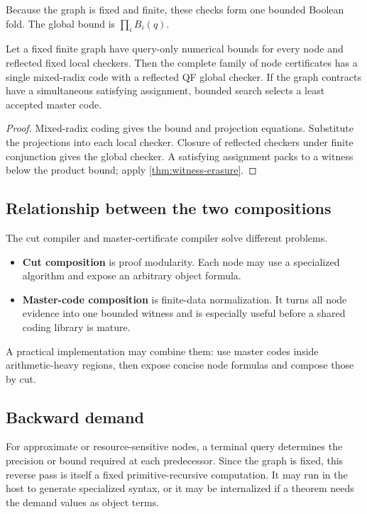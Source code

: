 Because the graph is fixed and finite, these checks form one bounded Boolean
fold.  The global bound is \(\prod_iB_i(q)\).

\begin{theorem}\label{thm:master-cert}
Let a fixed finite graph have query-only numerical bounds for every node and
reflected fixed local checkers.  Then the complete family of node certificates
has a single mixed-radix code with a reflected QF global checker.  If the graph
contracts have a simultaneous satisfying assignment, bounded search selects a
least accepted master code.
\end{theorem}

\begin{proof}
Mixed-radix coding gives the bound and projection equations.  Substitute the
projections into each local checker.  Closure of reflected checkers under
finite conjunction gives the global checker.  A satisfying assignment packs
to a witness below the product bound; apply \cref{thm:witness-erasure}.
\end{proof}

\subsection{Relationship between the two compositions}

The cut compiler and master-certificate compiler solve different problems.

\begin{itemize}
\item \textbf{Cut composition} is proof modularity.  Each node may use a
specialized algorithm and expose an arbitrary object formula.
\item \textbf{Master-code composition} is finite-data normalization.  It turns
all node evidence into one bounded witness and is especially useful before a
shared coding library is mature.
\end{itemize}

A practical implementation may combine them: use master codes inside
arithmetic-heavy regions, then expose concise node formulas and compose those
by cut.

\subsection{Backward demand}

For approximate or resource-sensitive nodes, a terminal query determines the
precision or bound required at each predecessor.  Since the graph is fixed,
this reverse pass is itself a fixed primitive-recursive computation.  It may
run in the host to generate specialized syntax, or it may be internalized if a
theorem needs the demand values as object terms.

